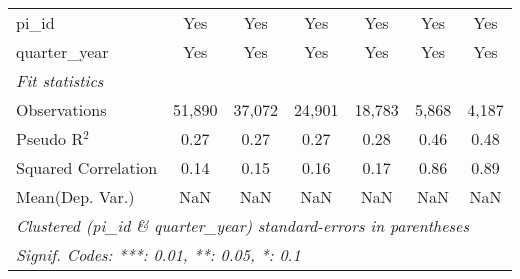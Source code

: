 \begin{tabular}{lcccccc}
   pi\_id                                                     & Yes           & Yes            & Yes           & Yes           & Yes           & Yes\\  
   quarter\_year                                              & Yes           & Yes            & Yes           & Yes           & Yes           & Yes\\  
   \midrule
   \emph{Fit statistics}\\
   Observations                                               & 51,890        & 37,072         & 24,901        & 18,783        & 5,868         & 4,187\\  
   Pseudo R$^2$                                               & 0.27          & 0.27           & 0.27          & 0.28          & 0.46          & 0.48\\  
   Squared Correlation                                        & 0.14          & 0.15           & 0.16          & 0.17          & 0.86          & 0.89\\  
Mean(Dep. Var.) & NaN & NaN & NaN & NaN & NaN & NaN \\
   \midrule \midrule
   \multicolumn{7}{l}{\emph{Clustered (pi\_id \& quarter\_year) standard-errors in parentheses}}\\
   \multicolumn{7}{l}{\emph{Signif. Codes: ***: 0.01, **: 0.05, *: 0.1}}\\
\end{tabular}
\par\endgroup
